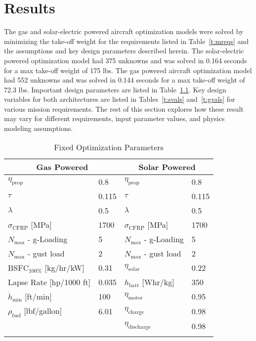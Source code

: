 
\chapter{Results}

The gas and solar-electric powered aircraft optimization models were solved by minimizing the take-off weight for the requirements listed in Table~\ref{t:mreqs} and the assumptions and key design parameters described herein. 
The solar-electric powered optimization model had 375 unknowns and was solved in 0.164 seconds for a max take-off weight of 175 lbs.
The gas powered aircraft optimization model had 552 unknowns and was solved in 0.144 seconds for a max take-off weight of 72.3 lbs.  
Important design parameters are listed in Table~\ref{t:gassolarparams}.
Key design variables for both architectures are listed in Tables~\ref{t:svals} and~\ref{t:gvals} for various mission requirements. 
The rest of this section explores how these result may vary for different requirements, input parameter values, and physics modeling assumptions. 

\footnotesize
\begin{longtable}{llll}
\caption{Fixed Optimization Parameters} \\
\toprule
\toprule
\multicolumn{2}{c}{Gas Powered} & \multicolumn{2}{c}{Solar Powered}\\
\midrule
$\eta_{\text{prop}}$         & 0.8  & $\eta_{\text{prop}}$         & 0.8 \\
$\tau$                       & 0.115 & $\tau$                       & 0.115 \\
$\lambda$                    & 0.5  & $\lambda$                    & 0.5 \\
$\sigma_{\text{CFRP}}$ [MPa] & 1700 & $\sigma_{\text{CFRP}}$ [MPa] & 1700  \\
$N_{\text{max}}$ - g-Loading & 5    & $N_{\text{max}}$ - g-Loading & 5 \\
$N_{\text{max}}$ - gust load & 2    & $N_{\text{max}}$ - gust load & 2 \\
$\text{BSFC}_{100\%}$ [kg/hr/kW] & 0.31 & $\eta_{\text{solar}}$      & 0.22 \\
Lapse Rate [hp/1000 ft]      & 0.035 &  $h_{\text{batt}}$ [Whr/kg]   & 350 \\
$\dot{h}_{\text{min}}$ [ft/min] & 100 & $\eta_{\text{motor}}$           & 0.95 \\ 
$\rho_{\text{fuel}} $ [lbf/gallon] & 6.01 & $\eta_{\text{charge}}$          & 0.98 \\
                             &     & $\eta_{\text{discharge}}$       & 0.98 \\
\bottomrule
\label{t:gassolarparams}
 \end{longtable}


